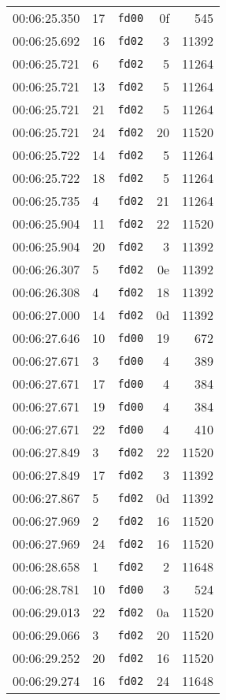 \documentclass{article}
\begin{document}
\begin{longtable}{lllrr}
00:06:25.350 & 17 & \texttt{fd00} & 0f & 545 \\
00:06:25.692 & 16 & \texttt{fd02} & 3 & 11392 \\
00:06:25.721 & 6 & \texttt{fd02} & 5 & 11264 \\
00:06:25.721 & 13 & \texttt{fd02} & 5 & 11264 \\
00:06:25.721 & 21 & \texttt{fd02} & 5 & 11264 \\
00:06:25.721 & 24 & \texttt{fd02} & 20 & 11520 \\
00:06:25.722 & 14 & \texttt{fd02} & 5 & 11264 \\
00:06:25.722 & 18 & \texttt{fd02} & 5 & 11264 \\
00:06:25.735 & 4 & \texttt{fd02} & 21 & 11264 \\
00:06:25.904 & 11 & \texttt{fd02} & 22 & 11520 \\
00:06:25.904 & 20 & \texttt{fd02} & 3 & 11392 \\
00:06:26.307 & 5 & \texttt{fd02} & 0e & 11392 \\
00:06:26.308 & 4 & \texttt{fd02} & 18 & 11392 \\
00:06:27.000 & 14 & \texttt{fd02} & 0d & 11392 \\
00:06:27.646 & 10 & \texttt{fd00} & 19 & 672 \\
00:06:27.671 & 3 & \texttt{fd00} & 4 & 389 \\
00:06:27.671 & 17 & \texttt{fd00} & 4 & 384 \\
00:06:27.671 & 19 & \texttt{fd00} & 4 & 384 \\
00:06:27.671 & 22 & \texttt{fd00} & 4 & 410 \\
00:06:27.849 & 3 & \texttt{fd02} & 22 & 11520 \\
00:06:27.849 & 17 & \texttt{fd02} & 3 & 11392 \\
00:06:27.867 & 5 & \texttt{fd02} & 0d & 11392 \\
00:06:27.969 & 2 & \texttt{fd02} & 16 & 11520 \\
00:06:27.969 & 24 & \texttt{fd02} & 16 & 11520 \\
00:06:28.658 & 1 & \texttt{fd02} & 2 & 11648 \\
00:06:28.781 & 10 & \texttt{fd00} & 3 & 524 \\
00:06:29.013 & 22 & \texttt{fd02} & 0a & 11520 \\
00:06:29.066 & 3 & \texttt{fd02} & 20 & 11520 \\
00:06:29.252 & 20 & \texttt{fd02} & 16 & 11520 \\
00:06:29.274 & 16 & \texttt{fd02} & 24 & 11648 \\

\end{longtable}
\end{document}

